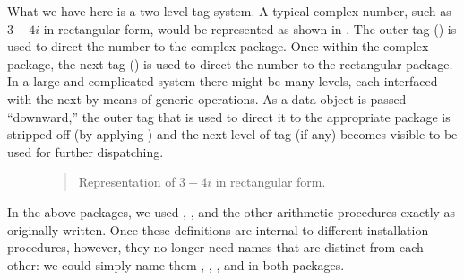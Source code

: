 \noindent
What we have here is a two-level tag system.  A typical complex number, such as
\( 3 + 4i \) in rectangular form, would be represented as shown in .
The outer tag () is used to direct the number to the
complex package.  Once within the complex package, the next tag
() is used to direct the number to the rectangular package.
In a large and complicated system there might be many levels, each interfaced
with the next by means of generic operations.  As a data object is passed
``downward,'' the outer tag that is used to direct it to the appropriate
package is stripped off (by applying ) and the next level of tag
(if any) becomes visible to be used for further dispatching.

\begin{figure}[tb]
\label{Figure 2.24}
\centering
\begin{comment}
\heading{Figure 2.24:} Representation of \( 3 + 4i \) in rectangular form.

\begin{example}
     +---+---+     +---+---+     +---+---+
---->| * | *-+---->| * | *-+---->| * | * |
     +-|-+---+     +-|-+---+     +-|-+-|-+
       |             |             |   |
       V             V             V   V
 +---------+   +-------------+  +---+ +---+
 | complex |   | rectangular |  | 3 | | 4 |
 +---------+   +-------------+  +---+ +---+
\end{example}
\end{comment}

\begin{quote}
 Representation of \( 3 + 4i \) in rectangular form.
\end{quote}
\end{figure}

In the above packages, we used , , and the
other arithmetic procedures exactly as originally written.  Once these
definitions are internal to different installation procedures, however, they no
longer need names that are distinct from each other: we could simply name them
, , , and  in both packages.


